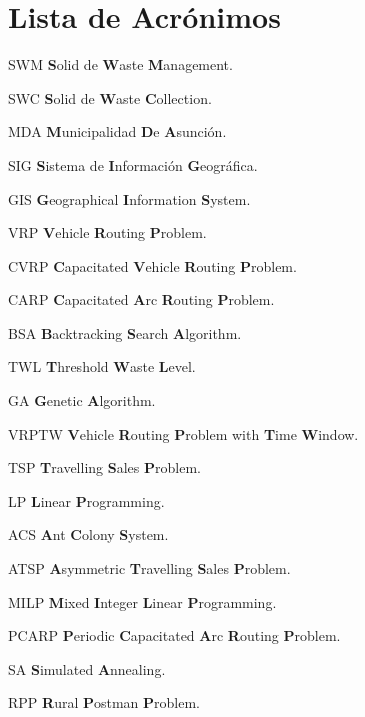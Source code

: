 \chapter*{Lista de Acrónimos\hfill}
\begin{abbreviations}
    \item[SWM] \textbf{S}olid de \textbf{W}aste \textbf{M}anagement.
    \item[SWC] \textbf{S}olid de \textbf{W}aste \textbf{C}ollection.
    \item[MDA] \textbf{M}unicipalidad \textbf{D}e \textbf{A}sunción.
    \item[SIG] \textbf{S}istema de \textbf{I}nformación \textbf{G}eográfica.
    \item[GIS] \textbf{G}eographical \textbf{I}nformation \textbf{S}ystem.
    \item[VRP] \textbf{V}ehicle \textbf{R}outing \textbf{P}roblem.
    \item[CVRP] \textbf{C}apacitated \textbf{V}ehicle \textbf{R}outing \textbf{P}roblem.
    \item[CARP] \textbf{C}apacitated \textbf{A}rc \textbf{R}outing \textbf{P}roblem.
    \item[BSA] \textbf{B}acktracking \textbf{S}earch \textbf{A}lgorithm.
    \item[TWL] \textbf{T}hreshold \textbf{W}aste \textbf{L}evel.
    \item[GA] \textbf{G}enetic \textbf{A}lgorithm.
    \item[VRPTW] \textbf{V}ehicle \textbf{R}outing \textbf{P}roblem with \textbf{T}ime \textbf{W}indow.
    \item[TSP] \textbf{T}ravelling \textbf{S}ales \textbf{P}roblem.
    \item[LP] \textbf{L}inear \textbf{P}rogramming.
    \item[ACS] \textbf{A}nt \textbf{C}olony \textbf{S}ystem.
    \item[ATSP] \textbf{A}symmetric \textbf{T}ravelling \textbf{S}ales \textbf{P}roblem.
    \item[MILP] \textbf{M}ixed \textbf{I}nteger \textbf{L}inear \textbf{P}rogramming.
    \item[PCARP] \textbf{P}eriodic \textbf{C}apacitated \textbf{A}rc \textbf{R}outing \textbf{P}roblem.
    \item[SA] \textbf{S}imulated \textbf{A}nnealing.
    \item[RPP] \textbf{R}ural \textbf{P}ostman \textbf{P}roblem.

\end{abbreviations}
